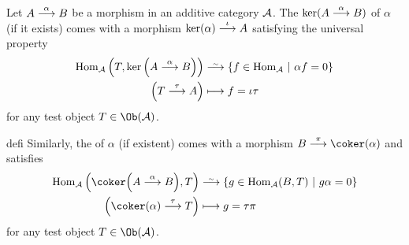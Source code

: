 \documentclass[a4paper,parskip=half,numbers=enddot, DIV=12]{scrreprt}
\begin{document}
\begin{defi}
	Let $A\morphism[\alpha]B$ be a morphism in an additive category $\mathcal{A}$. The  $\ker(A\morphism[\alpha]B)$ of $\alpha$ (if it exists) comes with a morphism $\ker(\alpha)\morphism[\iota]A$ satisfying the universal property
	\begin{align*}
	\Hom_\Aa\left(T,\ker\Big(A\morphism[\alpha]B\Big)\right)&\isomorphism \left\{f\in \Hom_\Aa\st \alpha f=0\right\}\\
	\left(T\morphism[\tau]A\right)&\longmapsto f=\iota\tau
	\end{align*}
	for any test object $T\in\Ob(\Aa)$. 
\end{defi}
\begin{varthm}{defi}
	Similarly, the  of $\alpha$ (if existent) comes with a morphism $B\morphism[\pi]\coker(\alpha)$ and satisfies
	\begin{align*}
	\Hom_\Aa\left(\coker\Big(A\morphism[\alpha]B\Big),T\right)&\isomorphism \left\{g\in\Hom_\Aa(B,T)\st g\alpha=0\right\}\\
	\left(\coker(\alpha)\morphism[\tau]T\right)&\longmapsto g=\tau\pi
	\end{align*}
	for any test object $T\in\Ob(\Aa)$.
\end{varthm}
	
\end{document}

